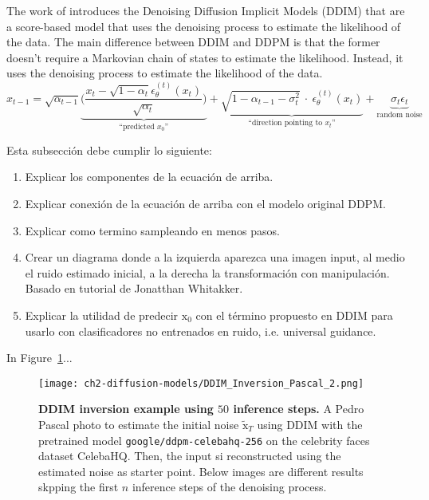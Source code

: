 The work of \cite{song2020denoising} introduces the Denoising Diffusion Implicit Models (DDIM) that are a score-based model that uses the denoising process to estimate the likelihood of the data. The main difference between DDIM and DDPM is that the former doesn't require a Markovian chain of states to estimate the likelihood. Instead, it uses the denoising process to estimate the likelihood of the data.\\

\begin{equation}\label{eqn:ddim-likelihood}
    x_{t-1} = 
    \sqrt{\alpha_{t-1}}\underbrace{\bigg(\frac{x_{t}-\sqrt{1-\alpha_{t}}\epsilon_{\theta}^{(t)}(x_{t})}{\sqrt{\alpha_{t}}}\bigg)}_{\text{``predicted $x_{0}$''}} 
    + \underbrace{\sqrt{1-\alpha_{t-1} - \sigma^2_{t}}~\cdot~\epsilon_{\theta}^{(t)}(x_{t})}_{\text{``direction pointing to $x_{t}$''}}
    + \underbrace{\sigma_{t}\epsilon_{t}}_{\text{random noise}}
\end{equation}

Esta subsección debe cumplir lo siguiente:

\begin{enumerate}
    \item Explicar los componentes de la ecuación de arriba.
    \item Explicar conexión de la ecuación de arriba con el modelo original DDPM.
    \item Explicar como termino sampleando en menos pasos.
    \item Crear un diagrama donde a la izquierda aparezca una imagen input, al medio el ruido estimado inicial, a la derecha la transformación con
manipulación. Basado en tutorial de Jonatthan Whitakker.
    \item Explicar la utilidad de predecir $\mathrm{x}_{0}$ con el término
    propuesto en DDIM para usarlo con clasificadores no entrenados en ruido, i.e. universal guidance.
\end{enumerate}

 In Figure~\ref{fig:ddim-inversion-pascal}...

\begin{figure}[ht]
    \centering
    \texttt{[image: ch2-diffusion-models/DDIM\_Inversion\_Pascal\_2.png]}
    \captionsetup{width=\textwidth} %
    \caption{\textbf{DDIM inversion example using $50$ inference steps.} A Pedro Pascal photo to estimate the initial noise $\tilde{\mathrm{x}}_T$ using DDIM with the pretrained model \texttt{google/ddpm-celebahq-256} on the celebrity faces dataset CelebaHQ. Then, the input si reconstructed using the estimated noise as starter point. Below images are different results skpping the first $n$ inference steps of the denoising process.}
    \label{fig:ddim-inversion-pascal}
  \end{figure}


